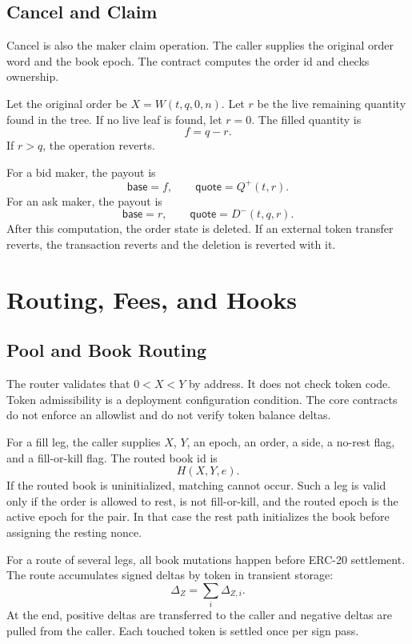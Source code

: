\documentclass[11pt]{article}
\begin{document}
\subsection{Cancel and Claim}

Cancel is also the maker claim operation.  The caller supplies the
original order word and the book epoch.  The contract computes the order
id and checks ownership.

Let the original order be \(X=W(t,q,0,n)\).  Let \(r\) be the live
remaining quantity found in the tree.  If no live leaf is found, let
\(r=0\).  The filled quantity is
\[
  f=q-r.
\]
If \(r>q\), the operation reverts.

For a bid maker, the payout is
\[
  \mathsf{base}=f,\qquad \mathsf{quote}=Q^{+}(t,r).
\]
For an ask maker, the payout is
\[
  \mathsf{base}=r,\qquad
  \mathsf{quote}=D^{-}(t,q,r).
\]
After this computation, the order state is deleted.  If an external
token transfer reverts, the transaction reverts and the deletion is
reverted with it.

\section{Routing, Fees, and Hooks}

\subsection{Pool and Book Routing}

The router validates that \(0<X<Y\) by address.  It does not check token
code.  Token admissibility is a deployment configuration condition.
The core contracts do not enforce an allowlist and do not verify token
balance deltas.

For a fill leg, the caller supplies \(X\), \(Y\), an epoch, an order, a
side, a no-rest flag, and a fill-or-kill flag.  The routed book id is
\[
  H(X,Y,e).
\]
If the routed book is uninitialized, matching cannot occur.  Such a leg
is valid only if the order is allowed to rest, is not fill-or-kill, and
the routed epoch is the active epoch for the pair.  In that case the
rest path initializes the book before assigning the resting nonce.

For a route of several legs, all book mutations happen before ERC-20
settlement.  The route accumulates signed deltas by token in transient
storage:
\[
  \Delta_Z = \sum_i \Delta_{Z,i}.
\]
At the end, positive deltas are transferred to the caller and negative
deltas are pulled from the caller.  Each touched token is settled once
per sign pass.
\end{document}

